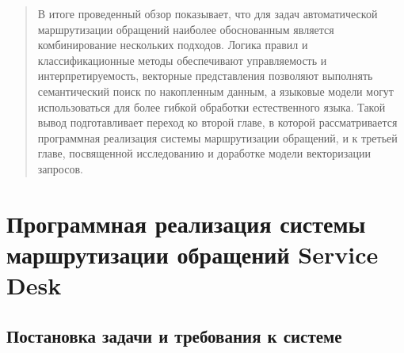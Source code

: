 \begin{quote}
В итоге проведенный обзор показывает, что для задач автоматической
маршрутизации обращений наиболее обоснованным является комбинирование
нескольких подходов. Логика правил и классификационные методы
обеспечивают управляемость и интерпретируемость, векторные представления
позволяют выполнять семантический поиск по накопленным данным, а
языковые модели могут использоваться для более гибкой обработки
естественного языка. Такой вывод подготавливает переход ко второй главе,
в которой рассматривается программная реализация системы маршрутизации
обращений, и к третьей главе, посвященной исследованию и доработке
модели векторизации запросов.
\end{quote}

\hypertarget{ux43fux440ux43eux433ux440ux430ux43cux43cux43dux430ux44f-ux440ux435ux430ux43bux438ux437ux430ux446ux438ux44f-ux441ux438ux441ux442ux435ux43cux44b-ux43cux430ux440ux448ux440ux443ux442ux438ux437ux430ux446ux438ux438-ux43eux431ux440ux430ux449ux435ux43dux438ux439-service-desk}{%
\section{Программная реализация системы маршрутизации обращений Service
Desk}\label{ux43fux440ux43eux433ux440ux430ux43cux43cux43dux430ux44f-ux440ux435ux430ux43bux438ux437ux430ux446ux438ux44f-ux441ux438ux441ux442ux435ux43cux44b-ux43cux430ux440ux448ux440ux443ux442ux438ux437ux430ux446ux438ux438-ux43eux431ux440ux430ux449ux435ux43dux438ux439-service-desk}}

\hypertarget{ux43fux43eux441ux442ux430ux43dux43eux432ux43aux430-ux437ux430ux434ux430ux447ux438-ux438-ux442ux440ux435ux431ux43eux432ux430ux43dux438ux44f-ux43a-ux441ux438ux441ux442ux435ux43cux435}{%
\subsection{\texorpdfstring{Постановка задачи и требования к системе
}{Постановка задачи и требования к системе }}\label{ux43fux43eux441ux442ux430ux43dux43eux432ux43aux430-ux437ux430ux434ux430ux447ux438-ux438-ux442ux440ux435ux431ux43eux432ux430ux43dux438ux44f-ux43a-ux441ux438ux441ux442ux435ux43cux435}}

